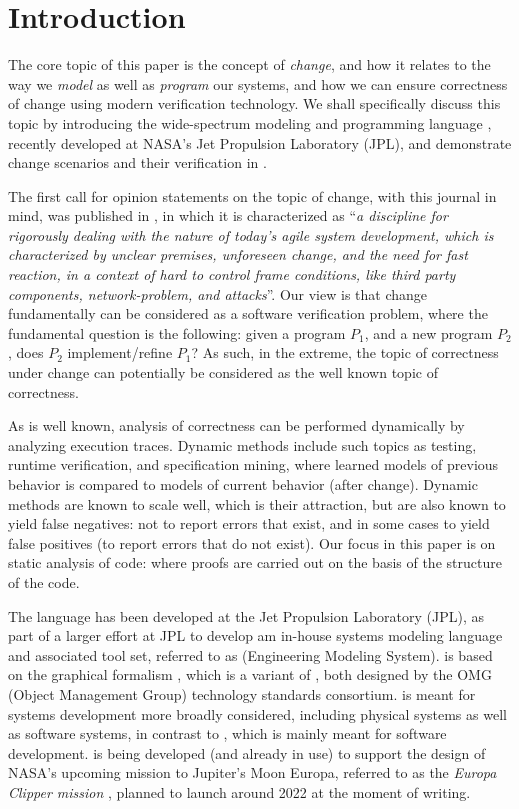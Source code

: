 
\section{Introduction}

The core topic of this paper is the concept of {\em change}, and how it
relates to the way we {\em model} as well as {\em program} our systems, and how 
we can ensure correctness of change using modern verification technology.
We shall specifically discuss this topic by introducing the wide-spectrum
modeling and programming language \Klang, recently developed at NASA's Jet Propulsion 
Laboratory (JPL), and demonstrate change scenarios and their 
verification in \Klang.

The first call for opinion statements on the topic of change, with this 
journal in mind, was published in \cite{steffen-isola-2014}, in which it is 
characterized as ``{\em a discipline for rigorously dealing with the nature of 
today's agile system development, which is characterized by unclear premises, 
unforeseen change, and the need for fast reaction, in a context of hard to 
control frame conditions, like third party components, network-problem, and 
attacks}''. 
%
Our view is that change fundamentally can be considered as a software 
verification problem, where the fundamental question is the following: given a program 
$P_1$, and a new program $P_2$, does $P_2$ implement/refine $P_1$?
As such, in the extreme, the topic of correctness under change can  potentially be 
considered as the well known topic of correctness. 

As is well known, analysis of correctness can be performed dynamically by analyzing 
execution traces. Dynamic methods include such topics 
as testing, runtime verification, and specification mining, where learned models of 
previous behavior is compared to models of current behavior (after change). Dynamic 
methods are known to scale well, which is their attraction, but are also known to 
yield false negatives: not to report errors that exist, and in some cases to yield 
false positives (to report errors that do not exist). Our focus
in this paper is on static analysis of code: where proofs are carried out on the basis 
of the structure of the code.

The \Klang{} language has been developed at the Jet Propulsion Laboratory (JPL),
as part of a larger effort at JPL to develop am in-house systems modeling language and 
associated tool set, referred to as \ems{} (Engineering Modeling System). \ems{} is 
based on the graphical \sysml{} formalism \cite{sysml}, which is a variant of \uml{} 
\cite{uml}, both designed by the OMG (Object Management Group) technology standards 
consortium. \sysml{} is meant for systems development more broadly considered, 
including physical systems as well as software systems, in contrast to \uml{}, which 
is mainly meant for software development. 
\ems{} is being developed (and already in use) to support the design of NASA's 
upcoming mission to Jupiter's Moon Europa, referred to as the {\em Europa Clipper 
mission} \cite{europa-clipper}, planned to launch around 2022 at the 
moment of writing.

